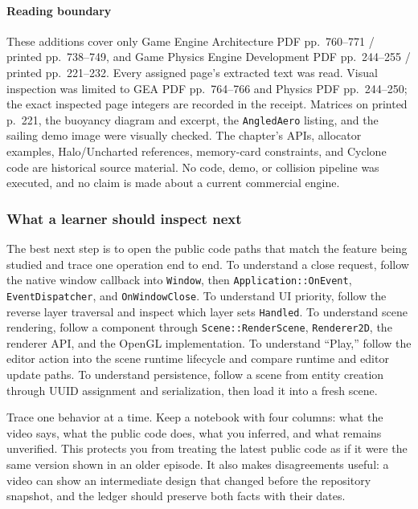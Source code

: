 \paragraph{Reading boundary}\label{reading-boundary}

These additions cover only Game Engine Architecture PDF pp.~760--771 / printed pp.~738--749, and Game Physics Engine Development PDF pp.~244--255 / printed pp.~221--232. Every assigned page's extracted text was read. Visual inspection was limited to GEA PDF pp.~764--766 and Physics PDF pp.~244--250; the exact inspected page integers are recorded in the receipt. Matrices on printed p.~221, the buoyancy diagram and excerpt, the \texttt{AngledAero} listing, and the sailing demo image were visually checked. The chapter's APIs, allocator examples, Halo/Uncharted references, memory-card constraints, and Cyclone code are historical source material. No code, demo, or collision pipeline was executed, and no claim is made about a current commercial engine.

\subsubsection{What a learner should inspect next}\label{what-a-learner-should-inspect-next}

The best next step is to open the public code paths that match the feature being studied and trace one operation end to end. To understand a close request, follow the native window callback into \texttt{Window}, then \texttt{Application::OnEvent}, \texttt{EventDispatcher}, and \texttt{OnWindowClose}. To understand UI priority, follow the reverse layer traversal and inspect which layer sets \texttt{Handled}. To understand scene rendering, follow a component through \texttt{Scene::RenderScene}, \texttt{Renderer2D}, the renderer API, and the OpenGL implementation. To understand ``Play,'' follow the editor action into the scene runtime lifecycle and compare runtime and editor update paths. To understand persistence, follow a scene from entity creation through UUID assignment and serialization, then load it into a fresh scene.

Trace one behavior at a time. Keep a notebook with four columns: what the video says, what the public code does, what you inferred, and what remains unverified. This protects you from treating the latest public code as if it were the same version shown in an older episode. It also makes disagreements useful: a video can show an intermediate design that changed before the repository snapshot, and the ledger should preserve both facts with their dates.

